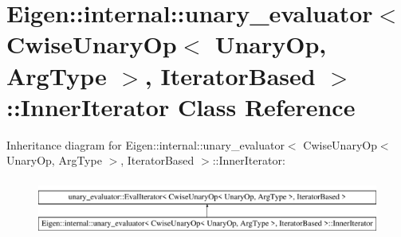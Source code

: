 \hypertarget{class_eigen_1_1internal_1_1unary__evaluator_3_01_cwise_unary_op_3_01_unary_op_00_01_arg_type_01_629bdbe0b310981fdaf6bb6b6c73ef55}{}\section{Eigen\+::internal\+::unary\+\_\+evaluator$<$ Cwise\+Unary\+Op$<$ Unary\+Op, Arg\+Type $>$, Iterator\+Based $>$\+::Inner\+Iterator Class Reference}
\label{class_eigen_1_1internal_1_1unary__evaluator_3_01_cwise_unary_op_3_01_unary_op_00_01_arg_type_01_629bdbe0b310981fdaf6bb6b6c73ef55}
Inheritance diagram for Eigen\+::internal\+::unary\+\_\+evaluator$<$ Cwise\+Unary\+Op$<$ Unary\+Op, Arg\+Type $>$, Iterator\+Based $>$\+::Inner\+Iterator\+:\begin{figure}[H]
\begin{center}
\leavevmode
\includegraphics[height=1.866667cm]{class_eigen_1_1internal_1_1unary__evaluator_3_01_cwise_unary_op_3_01_unary_op_00_01_arg_type_01_629bdbe0b310981fdaf6bb6b6c73ef55}
\end{center}
\end{figure}
